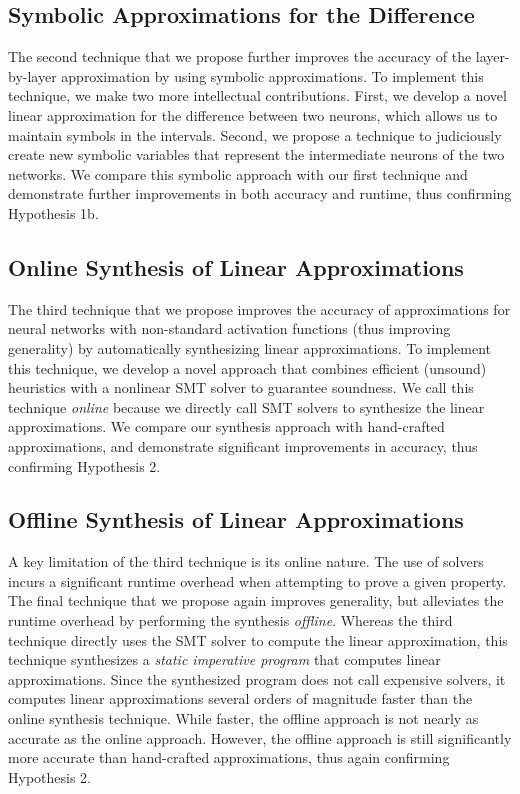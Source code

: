\subsection{Symbolic Approximations for the Difference}
The second technique that we propose further improves the accuracy of the
layer-by-layer approximation by using symbolic approximations. To implement this
technique, we make two more intellectual contributions. First, we develop a novel
linear approximation for the difference between two neurons, which allows us to
maintain symbols in the intervals. Second, we propose a technique to
judiciously create new symbolic variables that represent the intermediate neurons
of the two networks. We compare this symbolic approach with our first technique
and demonstrate further improvements in both accuracy and runtime, thus
confirming Hypothesis 1b.

\subsection{Online Synthesis of Linear Approximations}
The third technique that we propose improves the accuracy of approximations for
neural networks with non-standard activation functions (thus improving
generality) by automatically synthesizing linear approximations. To implement
this technique, we develop a novel approach that combines efficient (unsound) heuristics
with a nonlinear SMT solver to guarantee soundness. We call this technique
\textit{online}
because we directly call SMT solvers to synthesize the linear approximations. We compare
our synthesis approach with hand-crafted approximations, and demonstrate significant
improvements in accuracy, thus confirming Hypothesis 2.

\subsection{Offline Synthesis of Linear Approximations}
A key limitation of the third technique is its online nature. The use of solvers
incurs a significant runtime overhead when attempting to prove a given property. The
final technique that we propose again improves generality, but
alleviates the runtime overhead by performing the synthesis \textit{offline}.
Whereas the third technique directly uses the SMT solver to compute the linear
approximation, this technique synthesizes a \textit{static imperative program}
that computes linear approximations. Since the synthesized program does not call
expensive solvers, it computes linear approximations several orders of magnitude
faster than the online synthesis technique. While faster, the offline approach is
not nearly as accurate as the online approach. However, the offline approach is
still significantly more accurate than hand-crafted approximations, thus again
confirming Hypothesis 2.

